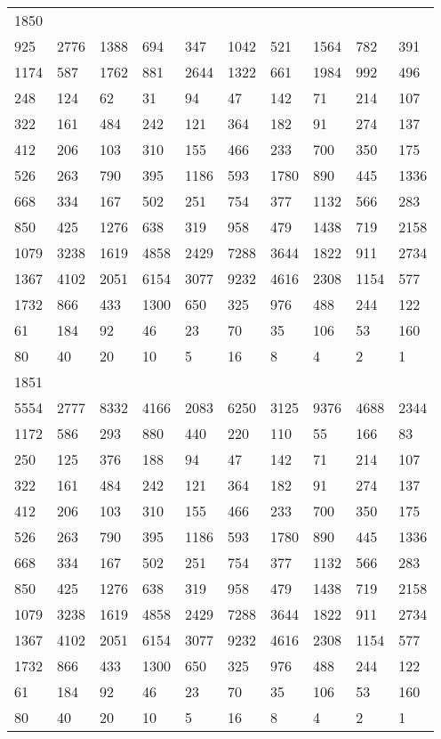 \begin{longtable}{*{10}{l}}
1850&&&&&&&&&\\
925& 2776& 1388& 694& 347& 1042& 521& 1564& 782& 391\\
1174& 587& 1762& 881& 2644& 1322& 661& 1984& 992& 496\\
248& 124& 62& 31& 94& 47& 142& 71& 214& 107\\
322& 161& 484& 242& 121& 364& 182& 91& 274& 137\\
412& 206& 103& 310& 155& 466& 233& 700& 350& 175\\
526& 263& 790& 395& 1186& 593& 1780& 890& 445& 1336\\
668& 334& 167& 502& 251& 754& 377& 1132& 566& 283\\
850& 425& 1276& 638& 319& 958& 479& 1438& 719& 2158\\
1079& 3238& 1619& 4858& 2429& 7288& 3644& 1822& 911& 2734\\
1367& 4102& 2051& 6154& 3077& 9232& 4616& 2308& 1154& 577\\
1732& 866& 433& 1300& 650& 325& 976& 488& 244& 122\\
61& 184& 92& 46& 23& 70& 35& 106& 53& 160\\
80& 40& 20& 10& 5& 16& 8& 4& 2& 1\\

1851&&&&&&&&&\\
5554& 2777& 8332& 4166& 2083& 6250& 3125& 9376& 4688& 2344\\
1172& 586& 293& 880& 440& 220& 110& 55& 166& 83\\
250& 125& 376& 188& 94& 47& 142& 71& 214& 107\\
322& 161& 484& 242& 121& 364& 182& 91& 274& 137\\
412& 206& 103& 310& 155& 466& 233& 700& 350& 175\\
526& 263& 790& 395& 1186& 593& 1780& 890& 445& 1336\\
668& 334& 167& 502& 251& 754& 377& 1132& 566& 283\\
850& 425& 1276& 638& 319& 958& 479& 1438& 719& 2158\\
1079& 3238& 1619& 4858& 2429& 7288& 3644& 1822& 911& 2734\\
1367& 4102& 2051& 6154& 3077& 9232& 4616& 2308& 1154& 577\\
1732& 866& 433& 1300& 650& 325& 976& 488& 244& 122\\
61& 184& 92& 46& 23& 70& 35& 106& 53& 160\\
80& 40& 20& 10& 5& 16& 8& 4& 2& 1\\


\end{longtable}
